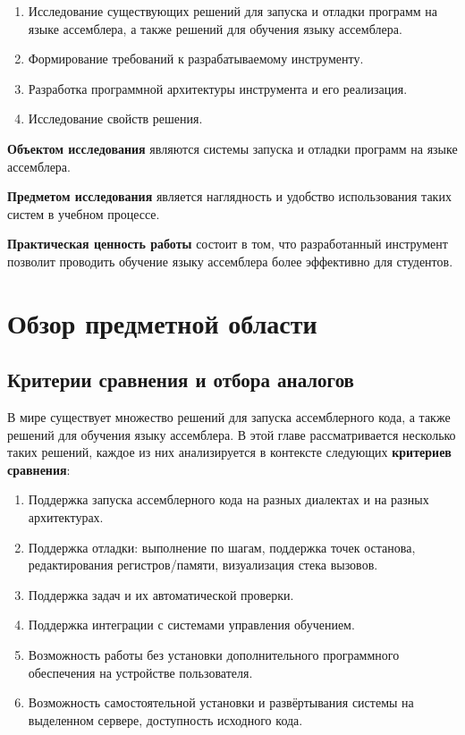 \documentclass[a4paper,article,14pt]{extarticle}
\begin{document}
\begin{enumerate}
    \item Исследование существующих решений для запуска и отладки программ на языке ассемблера, а также решений для обучения языку ассемблера.
    \item Формирование требований к разрабатываемому инструменту.
    \item Разработка программной архитектуры инструмента и его реализация.
    \item Исследование свойств решения.
\end{enumerate}

\textbf{Объектом исследования} являются системы запуска и отладки программ на языке ассемблера.

\textbf{Предметом исследования} является наглядность и удобство использования таких систем в учебном процессе.

\textbf{Практическая ценность работы} состоит в том, что разработанный инструмент позволит проводить обучение языку ассемблера более эффективно для студентов.

\pagebreak
\section{Обзор предметной области}
\subsection{Критерии сравнения и отбора аналогов}

В мире существует множество решений для запуска ассемблерного кода, а также решений для обучения языку ассемблера. В этой главе рассматривается несколько таких решений, каждое из них анализируется в контексте следующих \textbf{критериев сравнения}:

\begin{enumerate}
    \item Поддержка запуска ассемблерного кода на разных диалектах и на разных архитектурах.
    \item Поддержка отладки: выполнение по шагам, поддержка точек останова, редактирования регистров/памяти, визуализация стека вызовов.
    \item Поддержка задач и их автоматической проверки.
    \item Поддержка интеграции с системами управления обучением.
    \item Возможность работы без установки дополнительного программного обеспечения на устройстве пользователя.
    \item Возможность самостоятельной установки и развёртывания системы на выделенном сервере, доступность исходного кода.
\end{enumerate}
\end{document}
